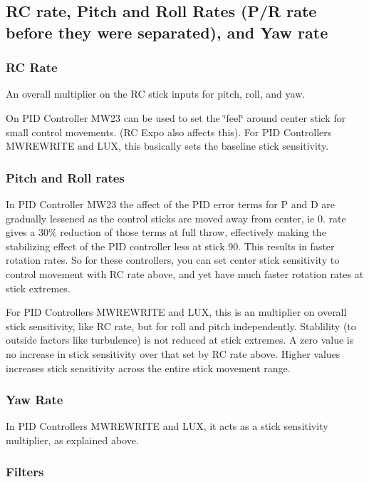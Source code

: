 \subsection*{R\+C rate, Pitch and Roll Rates (P/\+R rate before they were separated), and Yaw rate}

\subsubsection*{R\+C Rate}

An overall multiplier on the R\+C stick inputs for pitch, roll, and yaw.

On P\+I\+D Controller M\+W23 can be used to set the \char`\"{}feel\char`\"{} around center stick for small control movements. (R\+C Expo also affects this). For P\+I\+D Controllers M\+W\+R\+E\+W\+R\+I\+T\+E and L\+U\+X, this basically sets the baseline stick sensitivity.

\subsubsection*{Pitch and Roll rates}

In P\+I\+D Controller M\+W23 the affect of the P\+I\+D error terms for P and D are gradually lessened as the control sticks are moved away from center, ie 0. rate gives a 30\% reduction of those terms at full throw, effectively making the stabilizing effect of the P\+I\+D controller less at stick 90. This results in faster rotation rates. So for these controllers, you can set center stick sensitivity to control movement with R\+C rate above, and yet have much faster rotation rates at stick extremes.

For P\+I\+D Controllers M\+W\+R\+E\+W\+R\+I\+T\+E and L\+U\+X, this is an multiplier on overall stick sensitivity, like R\+C rate, but for roll and pitch independently. Stablility (to outside factors like turbulence) is not reduced at stick extremes. A zero value is no increase in stick sensitivity over that set by R\+C rate above. Higher values increases stick sensitivity across the entire stick movement range.

\subsubsection*{Yaw Rate}

In P\+I\+D Controllers M\+W\+R\+E\+W\+R\+I\+T\+E and L\+U\+X, it acts as a stick sensitivity multiplier, as explained above.

\subsubsection*{Filters}


